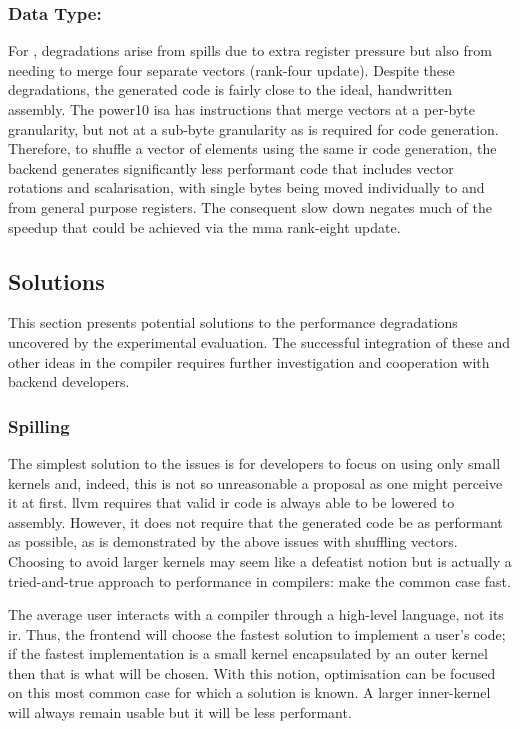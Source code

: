 \documentclass[\main/thesis.tex]{subfiles}
\begin{document}
\subsubsection{Data Type: \texorpdfstring{}{i4}}
For , degradations arise from \glspl{spill} due to extra register pressure but also from needing to merge four separate vectors (rank-four update).
Despite these degradations, the generated code is fairly close to the ideal, handwritten assembly.
The \gls{power10} \gls{isa} has instructions that merge vectors at a per-byte granularity, but not at a sub-byte granularity as is required for  code generation.
Therefore, to shuffle a vector of  elements using the same \gls{ir} code generation, the backend generates significantly less performant code that includes vector rotations and scalarisation, with single bytes being moved individually to and from general purpose registers.
The consequent slow down negates much of the speedup that could be achieved via the \gls{mma} rank-eight update.

\subsection{Solutions}
This section presents potential solutions to the performance degradations uncovered by the experimental evaluation.
The successful integration of these and other ideas in the compiler requires further investigation and cooperation with backend developers.

\subsubsection{Spilling}
\label{sec:spillSolution}
The simplest solution to the  issues is for developers to focus on using only small kernels and, indeed, this is not so unreasonable a proposal as one might perceive it at first.
\gls{llvm} requires that valid \gls{ir} code is always able to be lowered to assembly.
However, it does not require that the generated code be as performant as possible, as is demonstrated by the above issues with shuffling  vectors.
Choosing to avoid larger kernels may seem like a defeatist notion but is actually a tried-and-true approach to performance in compilers: make the common case fast.

The average user interacts with a compiler through a high-level language, not its \gls{ir}.
Thus, the frontend will choose the fastest solution to implement a user's code; if the fastest implementation is a small kernel encapsulated by an outer kernel then that is what will be chosen.
With this notion, optimisation can be focused on this most common case for which a solution is known.
A larger inner-kernel will always remain usable but it will be less performant.
\end{document}
